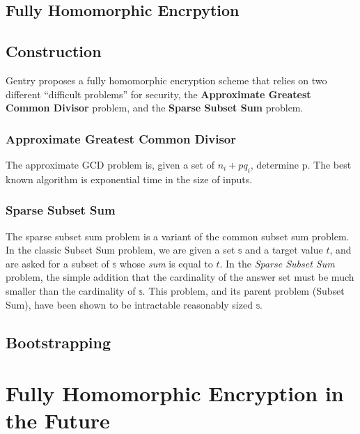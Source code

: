 \documentclass[a4paper,10pt]{article}
\begin{document}
\subsection{Fully Homomorphic Encrpytion}

\subsection{Construction}
Gentry proposes a fully homomorphic encryption scheme that relies on
two different ``difficult problems'' for security, the
\textbf{Approximate Greatest Common Divisor} problem, and the
\textbf{Sparse Subset Sum} problem.

\subsubsection{Approximate Greatest Common Divisor}
The approximate GCD problem is, given a set of $ n _{i} + pq_{i} $,
determine p. The best known algorithm is exponential time in the size
of inputs.


\subsubsection{Sparse Subset Sum}
The sparse subset sum problem is a variant of the common subset sum
problem. In the classic Subset Sum problem, we are given a set $
\mathbb{s} $ and a target value $t$, and are asked for a subset of $
\mathbb{s} $ whose \textit{sum} is equal to $t$. In the \textit{Sparse
  Subset Sum} problem, the simple addition that the cardinality of the
answer set must be much smaller than the cardinality of $ \mathbb{s}
$. This problem, and its parent problem (Subset Sum), have been shown
to be intractable reasonably sized $ \mathbb{s} $.

\subsection{Bootstrapping}

\section{Fully Homomorphic Encryption in the Future}

\pagebreak

\end{document}
